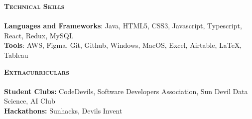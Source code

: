 \documentclass[10pt, a4paper]{article}
\newcommand{\lineunder} {
    \vspace*{-8pt} \\
    \hspace*{-18pt} \hrulefill \\
}
\newcommand{\header} [1] {
    {\hspace*{-15pt}\vspace*{3pt} \textsc{#1}}
    \vspace*{-6pt} \lineunder
}
\begin{document}
\header{\textbf{Technical Skills}}

\textbf{Languages and Frameworks}: Java, HTML5, CSS3, Javascript, Typescript, React, Redux, MySQL \\
\textbf{Tools}: AWS, Figma, Git, Github, Windows, MacOS, Excel, Airtable, \LaTeX, Tableau \\
\vspace{3mm}

\header{\textbf{Extracurriculars}}


\textbf{Student Clubs:} CodeDevils, Software Developers Association, Sun Devil Data Science, AI Club \\
\textbf{Hackathons:} Sunhacks, Devils Invent




    
\end{document}
